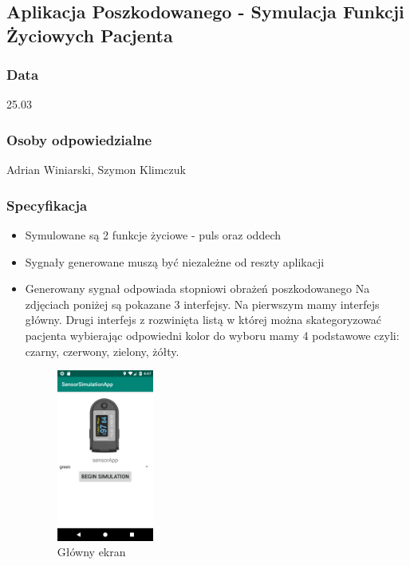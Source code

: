\subsection{Aplikacja Poszkodowanego - Symulacja Funkcji Życiowych Pacjenta }
\subsubsection{Data}
25.03
\subsubsection{Osoby odpowiedzialne}
Adrian Winiarski, Szymon Klimczuk

\subsubsection{Specyfikacja}
\begin{itemize}
    \item{Symulowane są 2 funkcje życiowe - puls oraz oddech}
    \item{Sygnały generowane muszą być niezależne od reszty aplikacji}
    \item Generowany sygnał odpowiada stopniowi obrażeń poszkodowanego
\newline
\newline
 Na zdjęciach poniżej są pokazane 3 interfejsy. Na pierwszym mamy interfejs główny. Drugi interfejs z rozwinięta listą w której można skategoryzować pacjenta wybierając odpowiedni kolor do wyboru mamy 4 podstawowe czyli: czarny, czerwony, zielony, żółty.
\begin{figure}[h!]
  \centering
    \includegraphics[width=0.30\textwidth]{img/start.png}
  \caption{Główny ekran} 
  \label{fig:org}                                       
\end{figure}
\end{itemize}
